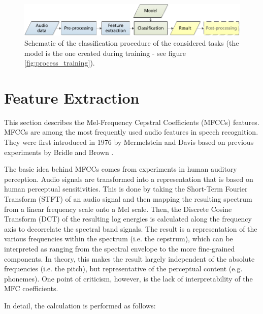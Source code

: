         \begin{figure}
            \begin{center}
                \includegraphics[width=1\textwidth]{figures/process_classification.png}
                \caption{Schematic of the classification procedure of the considered tasks (the model is the one created during training - see figure \ref{fig:process_training}).}
                \label{fig:process_classification}
            \end{center}
        \end{figure}

    \section{Feature Extraction}
        This section describes the Mel-Frequency Cepstral Coefficients (MFCCs) features. 
        MFCCs are among the most frequently used audio features in speech recognition. 
        They were first introduced in 1976 by Mermelstein and Davis \cite{mermelstein}\cite{davis_mermelstein} based on previous experiments by Bridle and Brown \cite{bridle_brown}.

        The basic idea behind MFCCs comes from experiments in human auditory perception. 
        Audio signals are transformed into a representation that is based on human perceptual sensitivities. 
        This is done by taking the Short-Term Fourier Transform (STFT) of an audio signal and then mapping the resulting spectrum from a linear frequency scale onto a Mel scale. 
        Then, the Discrete Cosine Transform (DCT) of the resulting log energies is calculated along the frequency axis to decorrelate the spectral band signals. 
        The result is a representation of the various frequencies within the spectrum (i.e. the cepstrum), which can be interpreted as ranging from the spectral envelope to the more fine-grained components. 
        In theory, this makes the result largely independent of the absolute frequencies (i.e. the pitch), but representative of the perceptual content (e.g. phonemes). 
        One point of criticism, however, is the lack of interpretability of the MFC coefficients.
        
        In detail, the calculation is performed as follows:


